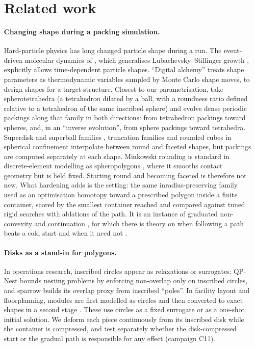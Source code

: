\section{Related work}\label{sec:related}
\paragraph{Changing shape during a packing simulation.} Hard-particle physics has long changed particle shape during a run. The event-driven molecular dynamics of \citet{Donev2005a}, which generalises Lubachevsky--Stillinger growth \citep{lubachevsky}, explicitly allows time-dependent particle shapes. ``Digital alchemy'' \citep{vanAnders2015,Geng2019} treats shape parameters as thermodynamic variables sampled by Monte Carlo shape moves, to design shapes for a target structure. Closest to our parametrisation, \citet{Jin2015} take spherotetrahedra (a tetrahedron dilated by a ball, with a roundness ratio defined relative to a tetrahedron of the same inscribed sphere) and evolve dense periodic packings along that family in both directions: from tetrahedron packings toward spheres, and, in an ``inverse evolution'', from sphere packings toward tetrahedra. Superdisk and superball families \citep{Jiao2008,Jiao2009}, truncation families \citep{Engel2012} and rounded cubes in spherical confinement \citep{Wang2018} interpolate between round and faceted shapes, but packings are computed separately at each shape. Minkowski rounding is standard in discrete-element modelling as spheropolygons \citep{AlonsoMarroquin2008,GalindoTorres2010}, where it smooths contact geometry but is held fixed. Starting round and becoming faceted is therefore not new. What hardening adds is the setting: the same inradius-preserving family used as an optimisation homotopy toward a prescribed polygon inside a finite container, scored by the smallest container reached and compared against tuned rigid searches with ablations of the path. It is an instance of graduated non-convexity and continuation \citep{blake,AllgowerGeorg1990}, for which there is theory on when following a path beats a cold start and when it need not \citep{Mobahi2015,Hazan2016}.

\paragraph{Disks as a stand-in for polygons.} In operations research, inscribed circles appear as relaxations or surrogates: QP-Nest \citep{Jones2014} bounds nesting problems by enforcing non-overlap only on inscribed circles, and sparrow \citep{Gardeyn2025} builds its overlap proxy from inscribed ``poles''. In facility layout and floorplanning, modules are first modelled as circles and then converted to exact shapes in a second stage \citep{AnjosVannelli2002,Luo2008}. These use circles as a fixed surrogate or as a one-shot initial solution. We deform each piece continuously from its inscribed disk while the container is compressed, and test separately whether the disk-compressed start or the gradual path is responsible for any effect (campaign C11).


